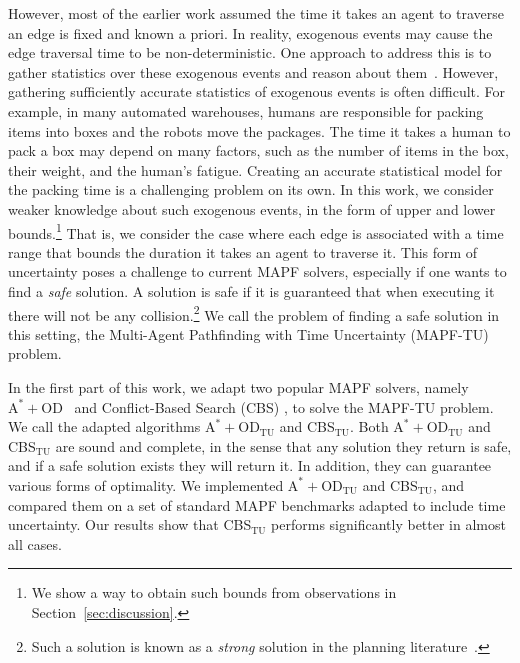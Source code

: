 \documentclass[jair,twoside,11pt,theapa]{article}
\newcommand{\oda}{$\mathrm{A^{*}+OD}$\xspace}
\newcommand{\odatu}{$\mathrm{A^{*}+OD_{TU}}$\xspace}
\newcommand{\cbstu}{CBS$\mathrm{_{TU}}$\xspace}
\newcommand{\mapftu}{MAPF-TU\xspace}
\begin{document}
However, most of the earlier work assumed the time it takes an agent to traverse an edge is fixed and known a priori. 
In reality, exogenous events may cause the edge traversal time to be non-deterministic. 
One approach to address this is to gather statistics over these exogenous events and reason about them~. %
However, gathering sufficiently accurate statistics of exogenous events is often difficult. 
For example, in many automated warehouses, humans are responsible for packing items into boxes and the robots move the packages.
The time it takes a human to pack a box may depend on many factors, such as the number of items in the box, their weight, and the human's fatigue. Creating an accurate statistical model for the packing time is a challenging problem on its own. 
In this work, we consider weaker knowledge about such exogenous events, in the form of upper and lower bounds.\footnote{We show a way to obtain such bounds from observations in Section~\ref{sec:discussion}.} That is, we consider the case where each edge is associated with a time range that bounds the duration it takes an agent to traverse it. 
This form of uncertainty poses a challenge to current MAPF solvers, especially if one wants to find a \emph{safe} solution. A solution is safe if it is guaranteed that when executing it there will not be any collision.\footnote{Such a solution is known as a \emph{strong} solution in the planning literature~.} %
We call the problem of finding a safe solution in this setting, the Multi-Agent Pathfinding with Time Uncertainty (\mapftu) problem. 


In the first part of this work, we adapt two popular MAPF solvers, namely \oda\  and Conflict-Based Search (CBS) , to solve the \mapftu problem. 
We call the adapted algorithms \odatu and \cbstu. 
Both \odatu and \cbstu are sound and complete, in the sense that any solution they return is safe, and if a safe solution exists they will return it.  
In addition, they can guarantee various forms of optimality. 
We implemented \odatu and \cbstu, and compared them on a set of standard MAPF benchmarks adapted to include time uncertainty. Our results show that \cbstu performs significantly better in almost all cases. 
\end{document}
